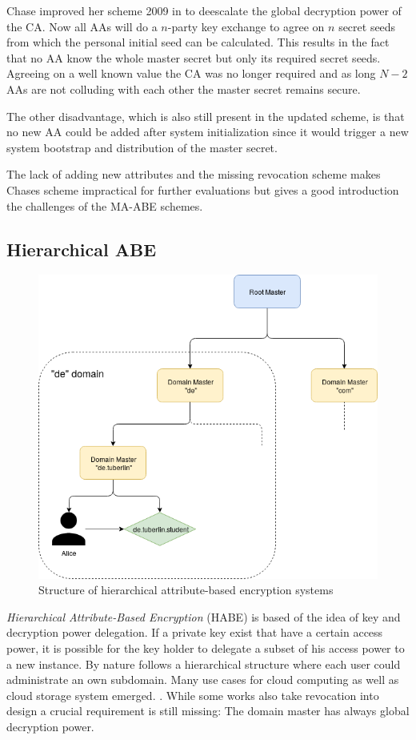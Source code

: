 Chase improved her scheme 2009 in \cite{chase2009improving} to deescalate the global decryption power of the CA. Now all \ac{AA}s will do a $n$-party key exchange to agree on $n$ secret seeds from which the personal initial seed can be calculated. This results in the fact that no AA know the whole master secret but only its required secret seeds. Agreeing on a well known value the \ac{CA} was no longer required and as long $N-2$ \ac{AA}s are not colluding with each other the master secret remains secure. 

The other disadvantage, which is also still present in the updated scheme, is that no new \ac{AA} could be added after system initialization since it would trigger a new system bootstrap and distribution of the master secret. 

The lack of adding new attributes and the missing revocation scheme makes Chases scheme impractical for further evaluations but gives a good introduction the challenges of the \ac{MA-ABE} schemes.

\subsection{Hierarchical \ac{ABE}}
\label{sec:HABE}

\begin{figure}[!ht]
\centering
    \includegraphics[width=0.7\linewidth]{img/HABE.png}
    \caption{Structure of hierarchical attribute-based encryption systems}
    \label{fig:habe}
\end{figure}

\textit{Hierarchical Attribute-Based Encryption} (\ac{HABE}) is based of the idea of key and decryption power delegation. If a private key exist that have a certain access power, it is possible for the key holder to delegate a subset of his access power to a new instance. By nature follows a hierarchical structure where each user could administrate an own subdomain. Many use cases for cloud computing as well as cloud storage system emerged. \cite{Wang:2010:HAE:1866307.1866414}. While some works also take revocation into design a crucial requirement is still missing:  The domain master has always global decryption power. 

